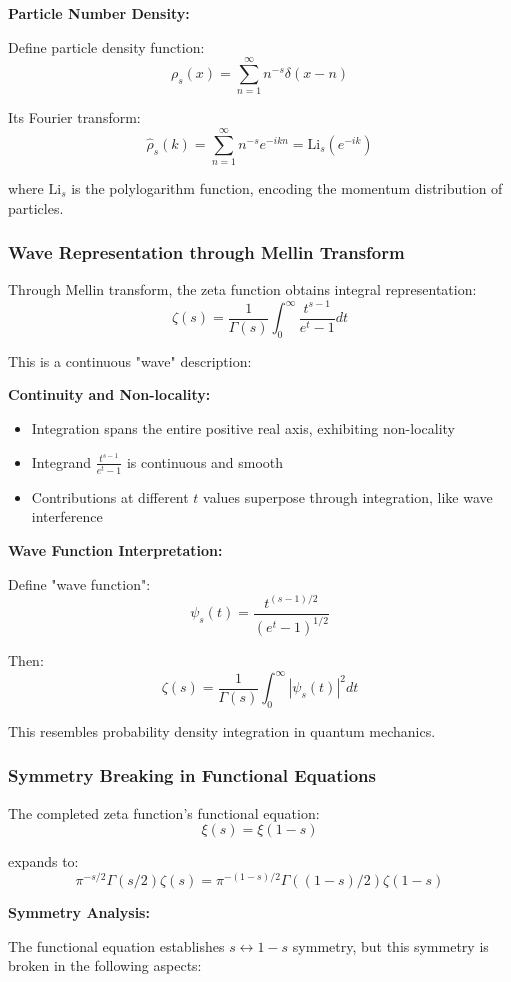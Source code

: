 \documentclass[11pt]{article}
\theoremstyle{plain}
\theoremstyle{definition}
\theoremstyle{remark}
\begin{document}
\textbf{Particle Number Density:}

Define particle density function:
$$\rho_s(x) = \sum_{n=1}^{\infty} n^{-s} \delta(x - n)$$

Its Fourier transform:
$$\hat{\rho}_s(k) = \sum_{n=1}^{\infty} n^{-s} e^{-ikn} = \text{Li}_s(e^{-ik})$$

where $\text{Li}_s$ is the polylogarithm function, encoding the momentum distribution of particles.

\subsubsection{Wave Representation through Mellin Transform}

Through Mellin transform, the zeta function obtains integral representation:
$$\zeta(s) = \frac{1}{\Gamma(s)} \int_0^{\infty} \frac{t^{s-1}}{e^t - 1} dt$$

This is a continuous "wave" description:

\textbf{Continuity and Non-locality:}
\begin{itemize}
\item Integration spans the entire positive real axis, exhibiting non-locality
\item Integrand $\frac{t^{s-1}}{e^t - 1}$ is continuous and smooth
\item Contributions at different $t$ values superpose through integration, like wave interference
\end{itemize}

\textbf{Wave Function Interpretation:}

Define "wave function":
$$\psi_s(t) = \frac{t^{(s-1)/2}}{(e^t - 1)^{1/2}}$$

Then:
$$\zeta(s) = \frac{1}{\Gamma(s)} \int_0^{\infty} |\psi_s(t)|^2 dt$$

This resembles probability density integration in quantum mechanics.

\subsubsection{Symmetry Breaking in Functional Equations}

The completed zeta function's functional equation:
$$\xi(s) = \xi(1-s)$$

expands to:
$$\pi^{-s/2} \Gamma(s/2) \zeta(s) = \pi^{-(1-s)/2} \Gamma((1-s)/2) \zeta(1-s)$$

\textbf{Symmetry Analysis:}

The functional equation establishes $s \leftrightarrow 1-s$ symmetry, but this symmetry is broken in the following aspects:
\end{document}
